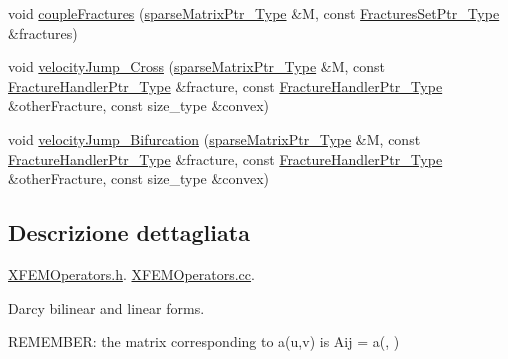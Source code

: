 \begin{DoxyCompactItemize}
\item 
void \hyperlink{namespacegetfem_a9a0b9f7498668cda8b547b10ac914a34}{couple\-Fractures} (\hyperlink{Core_8h_a87137a9501b38c724ac80bc955164bb7}{sparse\-Matrix\-Ptr\-\_\-\-Type} \&M, const \hyperlink{FracturesSet_8h_ac29a2a91d3af77fb459980a7db47f420}{Fractures\-Set\-Ptr\-\_\-\-Type} \&fractures)
\item 
void \hyperlink{namespacegetfem_acc74b86734c3814042e614d015f23876}{velocity\-Jump\-\_\-\-Cross} (\hyperlink{Core_8h_a87137a9501b38c724ac80bc955164bb7}{sparse\-Matrix\-Ptr\-\_\-\-Type} \&M, const \hyperlink{FractureHandler_8h_af23fb7a30aaff864bd42587af4f1e78a}{Fracture\-Handler\-Ptr\-\_\-\-Type} \&fracture, const \hyperlink{FractureHandler_8h_af23fb7a30aaff864bd42587af4f1e78a}{Fracture\-Handler\-Ptr\-\_\-\-Type} \&other\-Fracture, const size\-\_\-type \&convex)
\item 
void \hyperlink{namespacegetfem_a41dedc9759949101293821b324cf5ac6}{velocity\-Jump\-\_\-\-Bifurcation} (\hyperlink{Core_8h_a87137a9501b38c724ac80bc955164bb7}{sparse\-Matrix\-Ptr\-\_\-\-Type} \&M, const \hyperlink{FractureHandler_8h_af23fb7a30aaff864bd42587af4f1e78a}{Fracture\-Handler\-Ptr\-\_\-\-Type} \&fracture, const \hyperlink{FractureHandler_8h_af23fb7a30aaff864bd42587af4f1e78a}{Fracture\-Handler\-Ptr\-\_\-\-Type} \&other\-Fracture, const size\-\_\-type \&convex)
\end{DoxyCompactItemize}


\subsection{Descrizione dettagliata}
\hyperlink{XFEMOperators_8h}{X\-F\-E\-M\-Operators.\-h}. \hyperlink{XFEMOperators_8cc}{X\-F\-E\-M\-Operators.\-cc}.

Darcy bilinear and linear forms.

R\-E\-M\-E\-M\-B\-E\-R\-: the matrix corresponding to a(u,v) is Aij = a(, ) 

